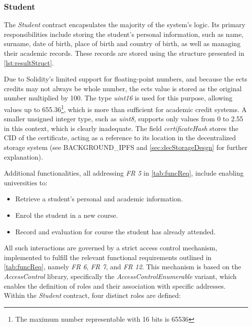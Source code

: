 \subsubsection{Student}
\label{sssec:studentContract}
The \textit{Student} contract encapsulates the majority of the system's logic. Its primary responsibilities include storing the student's personal information, such as name, surname, date of birth, place of birth and country of birth, as well as managing their academic records. These records are stored using the structure presented in \cref{lst:resultStruct}. 

Due to Solidity's limited support for floating-point numbers, and because the \acrshort{ects} credits may not always be whole number, the \acrshort{ects} value is stored as the original number multiplied by 100. The type \textit{uint16} is used for this purpose, allowing values up to 655.36\footnote{The maximum number representable with 16 bits is 65536},  which is more than sufficient for academic credit systems. A smaller unsigned integer type, such as \textit{uint8}, supports only values from 0 to 2.55 in this context, which is clearly inadequate. The field \textit{certificateHash} stores the CID of the certificate, acting as a reference to its location in the decentralized storage system (see BACKGROUND\_IPFS and \cref{sec:decStorageDesgn} for further explanation). 

Additional functionalities, all addressing \textit{FR 5} in \cref{tab:funcReq}, include enabling universities to:
\begin{itemize}
    \item Retrieve a student's personal and academic information.
    \item Enrol the student in a new course.
    \item Record and evaluation for course the student has already attended.
\end{itemize}
All such interactions are governed by a strict access control mechanism, implemented to fulfill the relevant functional requirements outlined in \cref{tab:funcReq}, namely \textit{FR 6}, \textit{FR 7}, and \textit{FR 12}. This mechanism is based on the \textit{AccessControl} library, specifically the \textit{AccessControlEnumerable} variant, which enables the definition of roles and their association with specific addresses. Within the \textit{Student} contract, four distinct roles are defined:


